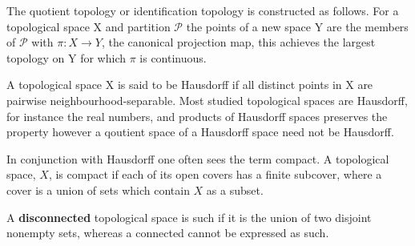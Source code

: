 \documentclass[../../main.tex]{subfiles}
\begin{document}
    The quotient topology or identification topology is constructed as follows. For a topological space X and partition $\mathcal{P}$ the points of a new space Y are the members of $\mathcal{P}$ with $\pi:X\to Y$, the canonical projection map, this achieves the largest topology on Y for which $\pi$ is continuous.
    
    A topological space X is said to be Hausdorff if all distinct points in X are pairwise neighbourhood-separable. Most studied topological spaces are Hausdorff, for instance the real numbers, and products of Hausdorff spaces preserves the property however a qoutient space of a Hausdorff space need not be Hausdorff.
    
    In conjunction with Hausdorff one often sees the term compact. A topological space, $X$, is compact if each of its open covers has a finite subcover, where a cover is a union of sets which contain $X$ as a subset. 
    
    A \textbf{disconnected} topological space is such if it is the union of two disjoint nonempty sets, whereas a connected cannot be expressed as such. 
\end{document}
